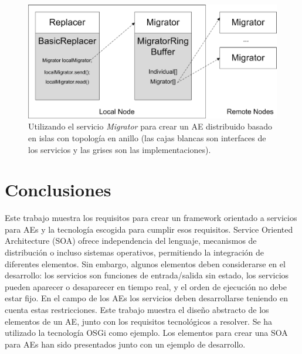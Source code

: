 \documentclass[runningheads]{llncs}
\begin{document}
\begin{figure}[ht] 
\begin{center} 
\includegraphics[scale=0.6]{images/migrator.eps}
\end{center} 
\caption{Utilizando el servicio {\em Migrator} para crear un AE distribuido basado en islas con topología en anillo (las cajas blancas son interfaces de los servicios y las grises son las implementaciones).} 
\label{MIGRATOR} 
\end{figure} 


\section{Conclusiones}
\label{sec:conclusions}
Este trabajo muestra los requisitos para crear un framework orientado a servicios para AEs y la tecnología escogida para cumplir esos requisitos.  Service Oriented Architecture (SOA) ofrece independencia del lenguaje, mecanismos de distribución o incluso sistemas operativos, permitiendo la integración de diferentes elementos. Sin embargo, algunos elementos deben considerarse en el desarrollo: los servicios son funciones de entrada/salida sin estado, los servicios pueden aparecer o desaparecer en tiempo real, y el orden de ejecución no debe estar fijo. En el campo de los AEs los servicios deben desarrollarse teniendo en cuenta estas restricciones. Este trabajo muestra el diseño abstracto de los elementos de un AE, junto con los requisitos tecnológicos a resolver. Se ha utilizado la tecnología OSGi como ejemplo. Los elementos para crear una SOA para AEs han sido presentados junto con un ejemplo de desarrollo.
\end{document}
